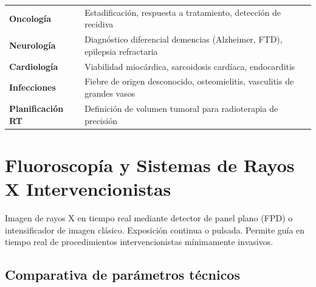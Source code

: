 \documentclass[11pt, a4paper]{article}
\begin{document}
\begin{clinicbox}
\begin{tabular}{@{}P{3.5cm} P{10cm}@{}}
\textbf{Oncología}          & Estadificación, respuesta a tratamiento, detección de recidiva \\[2pt]
\textbf{Neurología}         & Diagnóstico diferencial demencias (Alzheimer, FTD), epilepsia refractaria \\[2pt]
\textbf{Cardiología}        & Viabilidad miocárdica, sarcoidosis cardíaca, endocarditis \\[2pt]
\textbf{Infecciones}        & Fiebre de origen desconocido, osteomielitis, vasculitis de grandes vasos \\[2pt]
\textbf{Planificación RT}   & Definición de volumen tumoral para radioterapia de precisión \\
\end{tabular}
\end{clinicbox}

\newpage

\section{Fluoroscopía y Sistemas de Rayos X Intervencionistas}

\begin{principiobox}
Imagen de rayos X en tiempo real mediante detector de panel plano (FPD) o intensificador
de imagen clásico. Exposición continua o pulsada. Permite guía en tiempo real de
procedimientos intervencionistas mínimamente invasivos.
\end{principiobox}

\subsection{Comparativa de parámetros técnicos}
\end{document}
